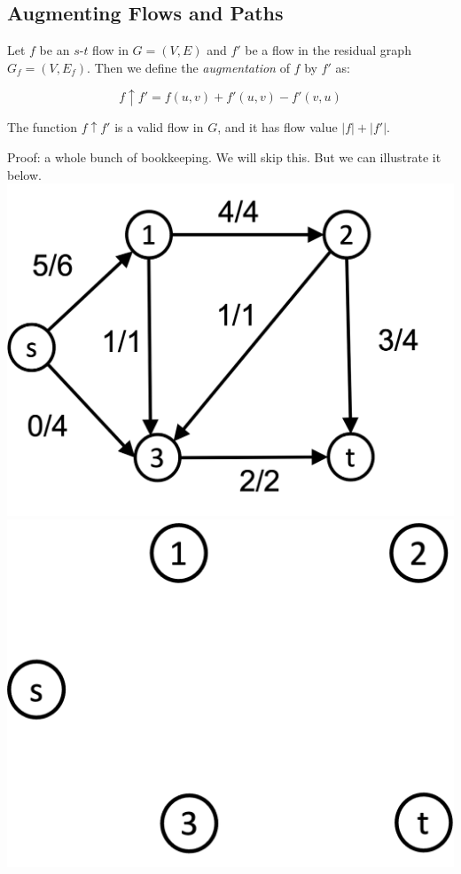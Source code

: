 \documentclass[11  pt]{article}
\begin{document}
	
	\newpage
	
	\subsection{Augmenting Flows and Paths}
	Let $f$ be an $s$-$t$ flow in $G = (V,E)$ and $f'$ be a flow in the residual graph $G_f = (V,E_f)$. Then we define the \emph{augmentation} of $f$ by $f'$ as:
	
	\begin{equation}
		f \uparrow f' = f(u,v) + f'(u,v) - f'(v,u)
	\end{equation}
	
	\vs{.5cm}
	
	\begin{lemma}
		The function $f\uparrow f'$ is a valid flow in $G$, and it has flow value $|f| + |f'|$.
	\end{lemma}
	Proof: a whole bunch of bookkeeping. We will skip this. But we can illustrate it below.\\
	
	\includegraphics[width = .5\linewidth]{flow5.png} \hspace{1cm} \includegraphics[width = .45\linewidth]{flow4empty.png} 
	
	\vspace{3cm} 
	
\end{document}
